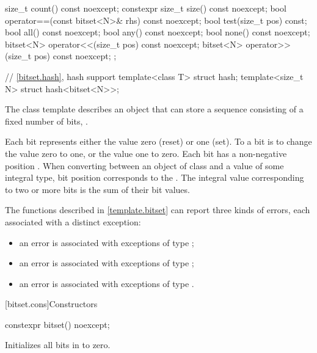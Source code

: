 \begin{codeblock}
{{    size_t count() const noexcept;
    constexpr size_t size() const noexcept;
    bool operator==(const bitset<N>& rhs) const noexcept;
    bool test(size_t pos) const;
    bool all() const noexcept;
    bool any() const noexcept;
    bool none() const noexcept;
    bitset<N> operator<<(size_t pos) const noexcept;
    bitset<N> operator>>(size_t pos) const noexcept;
  };

  // \ref{bitset.hash}, hash support
  template<class T> struct hash;
  template<size_t N> struct hash<bitset<N>>;
}
\end{codeblock}

\pnum
The class template
describes an object that can store a sequence consisting of a fixed number of
bits, .

\pnum
Each bit represents either the value zero (reset) or one (set).
To
a bit is to change the value zero to one, or the value one to
zero.
Each bit has a non-negative position .
When converting
between an object of class
and a value of some
integral type, bit position  corresponds to the
.
The integral value corresponding to two
or more bits is the sum of their bit values.

\pnum
The functions described in \ref{template.bitset} can report three kinds of
errors, each associated with a distinct exception:
\begin{itemize}
\item
an
error is associated with exceptions of type
;
%
\item
an
error is associated with exceptions of type
;
%
\item
an
error is associated with exceptions of type
.
%
\end{itemize}

[bitset.cons]{Constructors}

%
\begin{itemdecl}
constexpr bitset() noexcept;
\end{itemdecl}

\begin{itemdescr}
\pnum
\effects
Initializes all bits in  to zero.
\end{itemdescr}

